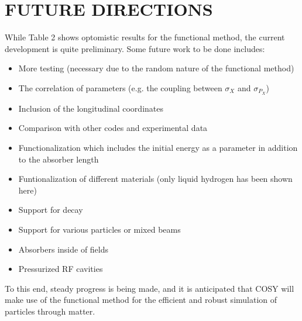 \documentclass{jacow}
\begin{document}
\section{FUTURE DIRECTIONS}
While Table 2 shows optomistic results for the functional method, the current development is quite preliminary. Some future work to be done includes:
\begin{itemize}
\item More testing (necessary due to the random nature of the functional method)
\item The correlation of parameters (e.g. the coupling between $\sigma_X$ and $\sigma_{P_X}$) 
\item Inclusion of the longitudinal coordinates
\item Comparison with other codes and experimental data
\item Functionalization which includes the initial energy as a parameter in addition to the absorber length
\item Funtionalization of different materials (only liquid hydrogen has been shown here)
\item Support for decay
\item Support for various particles or mixed beams
\item Absorbers inside of fields
\item Pressurized RF cavities
\end{itemize}
To this end, steady progress is being made, and it is anticipated that COSY will make use of the functional method for the efficient and robust simulation of particles through matter.
\end{document}

